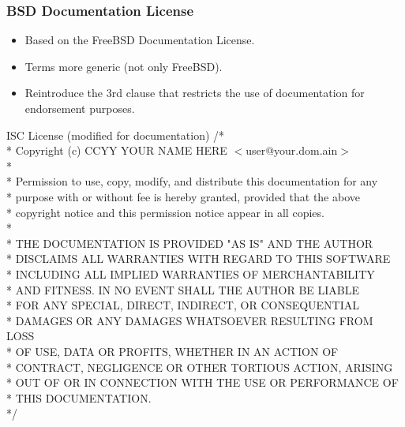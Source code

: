 
\begin{frame}
\frametitle {BSD Documentation License}


\begin{itemize}
\item Based on the FreeBSD Documentation License.
\item Terms more generic (not only FreeBSD).
\item Reintroduce the 3rd clause that restricts the use of documentation for endorsement purposes.
\end{itemize}

\end{frame}


\begin{frame}

\footnotesize

\begin{block}{ISC License (modified for documentation)} 
/* \\
 * Copyright (c) CCYY YOUR NAME HERE $<$user@your.dom.ain$>$ \\
 * \\
 * Permission to use, copy, modify, and distribute this documentation for any \\
 * purpose with or without fee is hereby granted, provided that the above \\
 * copyright notice and this permission notice appear in all copies. \\
 * \\
 * THE DOCUMENTATION IS PROVIDED "AS IS" AND THE AUTHOR \\
 * DISCLAIMS ALL WARRANTIES WITH REGARD TO THIS SOFTWARE \\
 * INCLUDING ALL IMPLIED WARRANTIES OF MERCHANTABILITY \\
 * AND FITNESS. IN NO EVENT SHALL THE AUTHOR BE LIABLE \\
 * FOR ANY SPECIAL, DIRECT, INDIRECT, OR CONSEQUENTIAL \\
 * DAMAGES OR ANY DAMAGES WHATSOEVER RESULTING FROM LOSS \\
 * OF USE, DATA OR PROFITS, WHETHER IN AN ACTION OF \\
 * CONTRACT, NEGLIGENCE OR OTHER TORTIOUS ACTION, ARISING \\
 * OUT OF OR IN CONNECTION WITH THE USE OR PERFORMANCE OF \\
 * THIS DOCUMENTATION. \\
 */
 
\end{block}

\end{frame}

